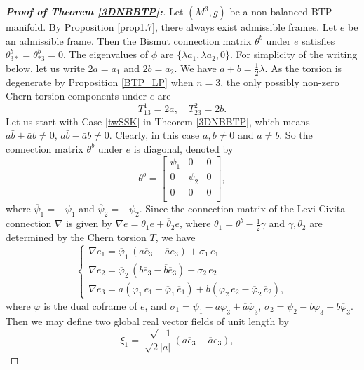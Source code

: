 \documentclass{amsart}
\numberwithin{equation}{section}
\theoremstyle{definition}
\renewcommand{\1}{\mathds{1}}
\renewcommand{\>}{\rightarrow}
\begin{document}
\begin{proof}[{\bf Proof of Theorem \ref{3DNBBTP}:}]
Let $(M^3,g)$ be a non-balanced BTP manifold. By Proposition \ref{prop1.7}, there always exist admissible frames.
Let $e$ be an admissible frame. Then the Bismut connection matrix $\theta^b$ under $e$ satisfies $\theta^b_{3\ast} = \theta^b_{\ast 3}=0$.
The eigenvalues of $\phi$ are $\{ \lambda a_1, \lambda a_2, 0\}$.
For simplicity of the writing below, let us write $2a=a_1$ and $2b=a_2$. We have $a+b=\frac{1}{2}\lambda$.
As the torsion is degenerate by Proposition \ref{BTP_LP} when $n=3$,
the only possibly non-zero Chern torsion components under $e$ are
\[T_{13}^1=2a,\quad T^2_{23}=2b.\]
Let us start with Case \eqref{twSSK} in Theorem \ref{3DNBBTP}, which means $a\bar{b}+\bar{a}b\neq 0$, $a\bar{b}-\bar{a}b\neq 0$. Clearly, in this case  $a,b\neq 0$ and $a \neq b$. So the connection matrix $\theta^b$  under $e$ is diagonal, denoted by
\[\theta^b = \begin{bmatrix} \psi_1 & 0 & 0 \\
                               0    & \psi_2 & 0 \\
                               0  & 0 & 0 \\ \end{bmatrix}\!\!,\]
where $\overline{\psi}_1 = - \psi_1$ and $\overline{\psi}_2 = - \psi_2$.
Since the connection matrix of the Levi-Civita connection $\nabla$ is given by $\nabla e = \theta_1 e + \overline{\theta}_2 \overline{e}$, where $\theta_1 = \theta^b - \frac{1}{2}\gamma$ and $\gamma,\theta_2$ are determined by the Chern torsion $T$, we have
\begin{equation}\label{generic}
\begin{cases}
\nabla e_1 =  \overline{\varphi}_1 \, (a \overline{e}_3 - \overline{a} e_3 ) + \sigma_1 \, e_1 \\
\nabla e_2 = \overline{\varphi}_2\,(b \overline{e}_3 - \overline{b} \overline{e}_3) + \sigma_2 \, e_2 \\
\nabla e_3 = a (\varphi_1\, e_1 - \overline{\varphi}_1 \, \overline{e}_1)
+ b (\varphi_2\, e_2 - \overline{\varphi}_2 \, \overline{e}_2),
\end{cases}
\end{equation}
where $\varphi$ is the dual coframe of $e$, and $\sigma_1 = \psi_1 - a \varphi_3 + \overline{a} \overline{\varphi}_3$, $\sigma_2 = \psi_2 - b \varphi_3 + \overline{b} \overline{\varphi}_3$. Then we may define two global real vector fields of unit length by
\[ \xi_1 = \frac{-\sqrt{-1}}{\sqrt{2}|a|}(a \overline{e}_3 - \overline{a} e_3 ),\quad
\]
\end{proof}
\end{document}
